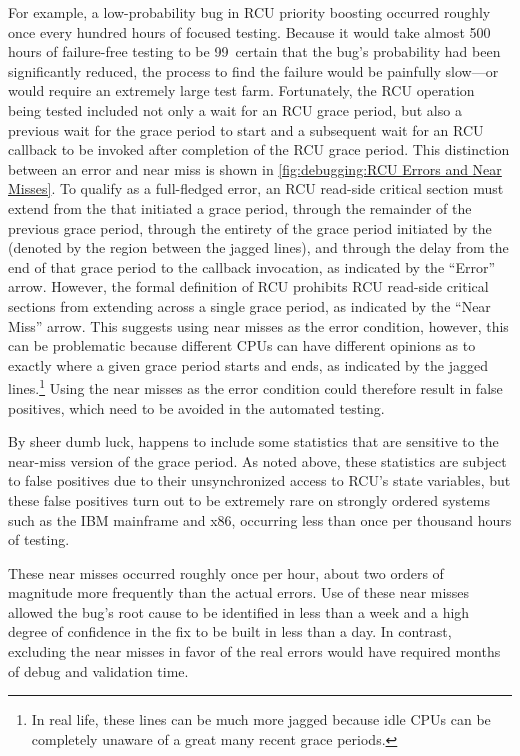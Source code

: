 For example, a low-probability bug in RCU priority boosting occurred
roughly once every hundred hours of focused  testing.
Because it would take almost 500 hours of failure-free testing to be
99\pct\ certain that the bug's probability had been significantly reduced,
the  process
to find the failure would be painfully slow---or would require an extremely
large test farm.
Fortunately, the RCU operation being tested included not only a wait for
an RCU grace period, but also a previous wait for the grace period to start
and a subsequent wait for an RCU callback to be
invoked after completion of the RCU grace period.
This distinction between an  error and near miss is
shown in
\cref{fig:debugging:RCU Errors and Near Misses}.
To qualify as a full-fledged error, an RCU read-side critical section
must extend from the  that initiated a grace period,
through the remainder of the previous grace period, through the
entirety of the grace period initiated by the 
(denoted by the region between the jagged lines), and
through the delay from the end of that grace period to the callback
invocation, as indicated by the ``Error'' arrow.
However, the formal definition of RCU prohibits RCU read-side critical
sections from extending across a single grace period, as indicated by
the ``Near Miss'' arrow.
This suggests using near misses as the error condition, however, this
can be problematic because different CPUs can have different opinions
as to exactly where a given
grace period starts and ends, as indicated by the jagged lines.\footnote{
	In real life, these lines can be much more jagged because idle
	CPUs can be completely unaware of a great many recent grace
	periods.}
Using the near misses as the error condition could therefore result
in false positives, which need to be avoided in the automated
 testing.

By sheer dumb luck,  happens to include some statistics that
are sensitive to the near-miss version of the grace period.
As noted above, these statistics are subject to false positives due to
their unsynchronized access to RCU's state variables,
but these false positives turn out to be extremely rare on strongly
ordered systems such as the IBM mainframe and x86, occurring less than
once per thousand hours of testing.

These near misses occurred roughly once per hour, about two orders of
magnitude more frequently than the actual errors.
Use of these near misses allowed the bug's root cause to be identified
in less than a week and a high degree of confidence in the fix to be
built in less than a day.
In contrast, excluding the near misses in favor of the real errors would
have required months of debug and validation time.


